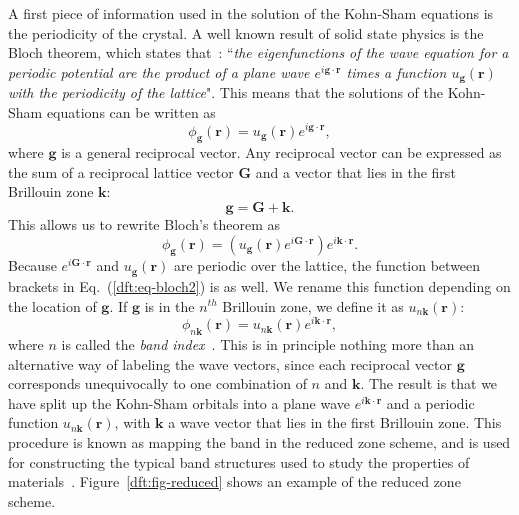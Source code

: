 \begin{refsection}
A first piece of information used in the solution of the Kohn-Sham equations 
is the periodicity of the crystal. A well known result of solid state physics 
is the Bloch theorem, which states that~\cite{Kittel2005}: ``\textit{the 
eigenfunctions of the wave equation for a periodic potential are the product 
of a plane wave $e^{i\mathbf{g}\cdot \mathbf{r}}$ times a function 
$u_{\mathbf{g}}(\mathbf{r})$ with the periodicity of the lattice}". This means 
that the solutions of the Kohn-Sham equations can be written as 
\begin{equation} 
\phi_{\mathbf{g}}(\mathbf{r}) = u_{\mathbf{g}}(\mathbf{r}) e^{i\mathbf{g}\cdot 
\mathbf{r}}, 
\end{equation} 
where $\mathbf{g}$ is a general reciprocal vector. Any reciprocal vector can 
be expressed as the sum of a reciprocal lattice vector $\mathbf{G}$ and a 
vector that lies in the first Brillouin zone $\mathbf{k}$:  
\begin{equation} 
\mathbf{g} = \mathbf{G} + \mathbf{k}. 
\end{equation} 
This allows us to rewrite Bloch's theorem as 
\begin{equation}\label{dft:eq-bloch2} 
\phi_{\mathbf{g}}(\mathbf{r}) = \left( u_{\mathbf{g}}(\mathbf{r}) 
e^{i\mathbf{G}\cdot \mathbf{r}}\right)e^{i\mathbf{k}\cdot \mathbf{r}}. 
\end{equation} 
Because $e^{i\mathbf{G}\cdot\mathbf{r}}$ and $u_{\mathbf{g}}(\mathbf{r})$ are 
periodic over the lattice, the function between brackets in 
Eq.~(\ref{dft:eq-bloch2}) is as well. We rename this function depending on the 
location of $\mathbf{g}$. If $\mathbf{g}$ is in the $n^{th}$ Brillouin zone, 
we define it as $u_{n\mathbf{k}}(\mathbf{r})$: 
\begin{equation}\label{dft:eq-bloch} 
\phi_{n\mathbf{k}}(\mathbf{r}) = u_{n\mathbf{k}}(\mathbf{r}) 
e^{i\mathbf{k}\cdot \mathbf{r}}, 
\end{equation} 
where $n$ is called the \textit{band index}~\cite{Cottenier2013}. This is in 
principle nothing more than an alternative way of labeling the wave vectors, 
since each reciprocal vector $\mathbf{g}$ corresponds unequivocally to one 
combination of $n$ and $\mathbf{k}$. The result is that we have split up the 
Kohn-Sham orbitals into a plane wave $e^{i\mathbf{k}\cdot \mathbf{r}}$ and a 
periodic function $u_{n\mathbf{k}}(\mathbf{r})$, with $\mathbf{k}$ a wave 
vector that lies in the first Brillouin zone. This procedure is known as 
mapping the band in the reduced zone scheme, and is used for constructing the 
typical band structures used to study the properties of 
materials~\cite{Kittel2005}. Figure~\ref{dft:fig-reduced} shows an example of the 
reduced zone scheme. 
 

\end{refsection}
